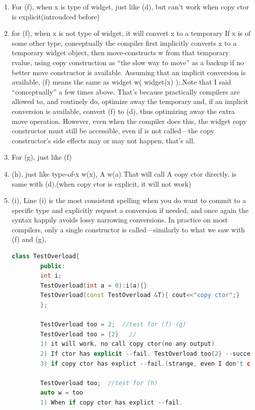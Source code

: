 \documentclass[a4paper,12pt,twoside]{book}
\begin{document}
\begin{itemize}
\begin{enumerate}
		\item For (f), when x is type of widget, just like (d), but can't work when copy ctor is explicit(introudced before)
		\item for (f), when x is not type of widget, it will convert x to a temporary If x is of some other type, conceptually the compiler first implicitly converts x to a temporary widget object, then move-constructs w from that temporary rvalue, using copy construction as “the slow way to move” as a backup if no better move constructor is available. Assuming that an implicit conversion is available, (f) means the same as widget w( widget(x) );.Note that I said “conceptually” a few times above. That’s because practically compilers are allowed to, and routinely do, optimize away the temporary and, if an implicit conversion is available, convert (f) to (d), thus optimizing away the extra move operation. However, even when the compiler does this, the widget copy constructor must still be accessible, even if is not called—the copy constructor’s side effects may or may not happen, that’s all.
		
		
		\item For (g), just like (f)
		
		\item (h), just like type-of-x w(x), A w(a) That will call A copy ctor directly. is same with (d).(when copy ctor is explicit, it will not work)
		
		\item (i), Line (i) is the most consistent spelling when you do want to commit to a specific type and explicitly request a conversion if needed, and once again the { } syntax happily avoids lossy narrowing conversions. In practice on most compilers, only a single constructor is called—similarly to what we saw with (f) and (g),
		
		\begin{lstlisting}[frame=single, language=c++,mathescape=true]
		class TestOverload{
		public:
		int i;
		TestOverload(int a = 0):i(a){}
		TestOverload(const TestOverload &T){ cout<<"copy ctor";} 
		};
		
		TestOverload too = 2;  //test for (f) (g)
		TestOverload too = {2}   //
		1) it will work, no call copy ctor(no any output)
		2) If ctor has explicit --fail. TestOverload too{2} --succeed.
		3) if copy ctor has explict --fail.(strange, even I don't call you, but you must accessible)
		
		TestOverload too;  //test for (h)
		auto w = too
		1) When if copy ctor has explict --fail.
		

\end{lstlisting}
\end{enumerate}
\end{itemize}
\end{document}
